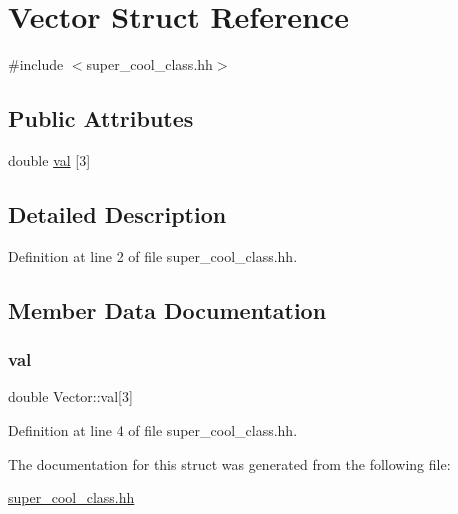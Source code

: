 \hypertarget{struct_vector}{}\section{Vector Struct Reference}
\label{struct_vector}


{\ttfamily \#include $<$super\+\_\+cool\+\_\+class.\+hh$>$}

\subsection*{Public Attributes}
\begin{DoxyCompactItemize}
\item 
double \hyperlink{struct_vector_adc995472c3e3bd817a76e705f2eddc90}{val} \mbox{[}3\mbox{]}
\end{DoxyCompactItemize}


\subsection{Detailed Description}


Definition at line 2 of file super\+\_\+cool\+\_\+class.\+hh.



\subsection{Member Data Documentation}
\mbox{\label{struct_vector_adc995472c3e3bd817a76e705f2eddc90}} 
\subsubsection{\texorpdfstring{val}{val}}
{\footnotesize\ttfamily double Vector\+::val\mbox{[}3\mbox{]}}



Definition at line 4 of file super\+\_\+cool\+\_\+class.\+hh.



The documentation for this struct was generated from the following file\+:\begin{DoxyCompactItemize}
\item 
\hyperlink{super__cool__class_8hh}{super\+\_\+cool\+\_\+class.\+hh}\end{DoxyCompactItemize}
